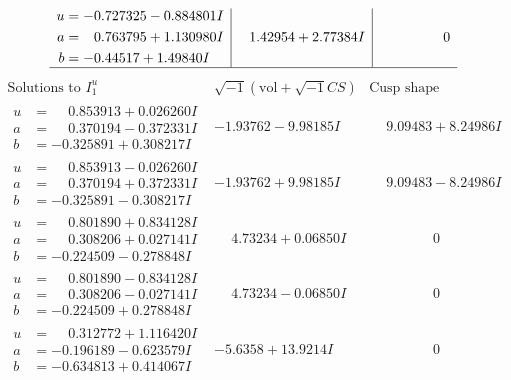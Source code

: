 \documentclass[1p]{elsarticle_modified}
\theoremstyle{definition}
\newcommand{\I}{\sqrt{-1}}
\begin{document}
$$\begin{array}{c|c|c}
\begin{aligned}
u &= -0.727325 - 0.884801 I \\
a &= \phantom{-}0.763795 + 1.130980 I \\
b &= -0.44517 + 1.49840 I\end{aligned}
 & \phantom{-}1.42954 + 2.77384 I & \phantom{-0.000000 } 0\\
 \hline 
 \end{array}$$\newpage$$\begin{array}{c|c|c}  
\text{Solutions to }I^u_{1}& \I (\text{vol} + \sqrt{-1}CS) & \text{Cusp shape}\\
 \hline 
\begin{aligned}
u &= \phantom{-}0.853913 + 0.026260 I \\
a &= \phantom{-}0.370194 - 0.372331 I \\
b &= -0.325891 + 0.308217 I\end{aligned}
 & -1.93762 - 9.98185 I & \phantom{-}9.09483 + 8.24986 I \\ \hline\begin{aligned}
u &= \phantom{-}0.853913 - 0.026260 I \\
a &= \phantom{-}0.370194 + 0.372331 I \\
b &= -0.325891 - 0.308217 I\end{aligned}
 & -1.93762 + 9.98185 I & \phantom{-}9.09483 - 8.24986 I \\ \hline\begin{aligned}
u &= \phantom{-}0.801890 + 0.834128 I \\
a &= \phantom{-}0.308206 + 0.027141 I \\
b &= -0.224509 - 0.278848 I\end{aligned}
 & \phantom{-}4.73234 + 0.06850 I & \phantom{-0.000000 } 0 \\ \hline\begin{aligned}
u &= \phantom{-}0.801890 - 0.834128 I \\
a &= \phantom{-}0.308206 - 0.027141 I \\
b &= -0.224509 + 0.278848 I\end{aligned}
 & \phantom{-}4.73234 - 0.06850 I & \phantom{-0.000000 } 0 \\ \hline\begin{aligned}
u &= \phantom{-}0.312772 + 1.116420 I \\
a &= -0.196189 - 0.623579 I \\
b &= -0.634813 + 0.414067 I\end{aligned}
 & -5.6358 + 13.9214 I & \phantom{-0.000000 } 0 \\ \hline\begin{aligned}

\end{aligned}
\end{array}$$
\end{document}

